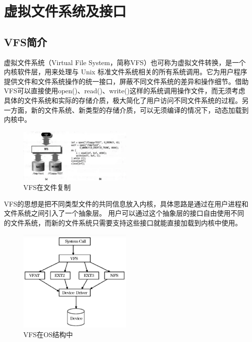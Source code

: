 \section{虚拟文件系统及接口}

\subsection{VFS简介}
虚拟文件系统（Virtual File System，简称VFS）也可称为虚拟文件转换，是一个内核软件层，用来处理与 Unix 标准文件系统相关的所有系统调用。它为用户程序提供文件和文件系统操作的统一接口，屏蔽不同文件系统的差异和操作细节。借助VFS可以直接使用open()、read()、write()这样的系统调用操作文件，而无须考虑具体的文件系统和实际的存储介质，极大简化了用户访问不同文件系统的过程。另一方面，新的文件系统、新类型的存储介质，可以无须编译的情况下，动态加载到内核中。

\begin{figure}[ht]
	\centering
	\includegraphics[width=0.5\textwidth]{figures/07-08-VFS-in-file-copy.png}
	\caption{VFS在文件复制}
	\label{fig:VFS-in-File-Copy}
\end{figure}

VFS的思想是把不同类型文件的共同信息放入内核，具体思路是通过在用户进程和文件系统之间引入了一个抽象层。
用户可以通过这个抽象层的接口自由使用不同的文件系统，而新的文件系统只需要支持这些接口就能直接加载到内核中使用。

\begin{figure}[ht]
	\centering
	\includegraphics[width=0.5\textwidth]{figures/07-08-VFS-in-OS.png}
	\caption{VFS在OS结构中}
	\label{fig:VFS-in-OS}
\end{figure}

